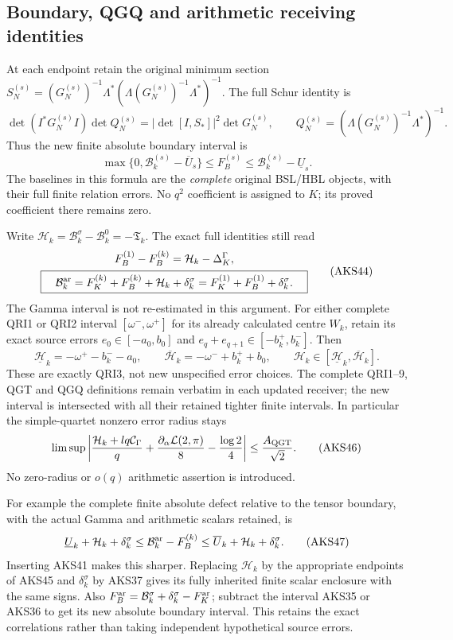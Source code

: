 \documentclass[11pt,a4paper]{article}
\begin{document}
\subsection{Boundary, QGQ and arithmetic receiving identities}
At each endpoint retain the original minimum section
$S_N^{(s)}=(G_N^{(s)})^{-1}\Lambda^*
(\Lambda(G_N^{(s)})^{-1}\Lambda^*)^{-1}$. The full Schur identity is
\[
 \det(I^*G_N^{(s)}I)\det Q_N^{(s)}
       =|\det[I,S_*]|^2\det G_N^{(s)},\qquad
 Q_N^{(s)}=(\Lambda(G_N^{(s)})^{-1}\Lambda^*)^{-1}.
 \tag{AKS42}
\]
Thus the new finite absolute boundary interval is
\[
 \max\{0,\mathcal B_k^{(s)}-\overline U_s\}
       \le F_B^{(s)}\le\mathcal B_k^{(s)}-\underline U_s.
 \tag{AKS43}
\]
The baselines in this formula are the \emph{complete} original BSL/HBL
objects, with their full finite relation errors. No $q^2$ coefficient is
assigned to $K$; its proved coefficient there remains zero.

Write $\mathcal H_k=\mathcal B_k^\sigma-\mathcal B_k^0=-\mathfrak T_k$.
The exact full identities still read
\[
\begin{gathered}
 F_B^{(1)}-F_B^{(k)}=\mathcal H_k-\Delta_K^\Gamma,\\
 \boxed{\quad\mathcal B_k^{\rm ar}
   =F_K^{(k)}+F_B^{(k)}+\mathcal H_k+\delta_k^\sigma
   =F_K^{(1)}+F_B^{(1)}+\delta_k^\sigma.\quad}
\end{gathered}\tag{AKS44}
\]
The Gamma interval is not re-estimated in this argument. For either
complete QRI1 or QRI2 interval $[\omega^-,\omega^+]$ for its already
calculated centre $W_k$, retain its exact source errors
$e_0\in[-a_0,b_0]$ and $e_q+e_{q+1}\in[-b_k^+,b_k^-]$. Then
\[
 \underline{\mathcal H}_k=-\omega^+-b_k^--a_0,
 \qquad\overline{\mathcal H}_k=-\omega^-+b_k^++b_0,
 \qquad \mathcal H_k\in
       [\underline{\mathcal H}_k,\overline{\mathcal H}_k].
 \tag{AKS45}
\]
These are exactly QRI3, not new unspecified error choices. The complete
QRI1--9, QGT and QGQ definitions remain verbatim in each updated receiver;
the new interval is intersected with all their retained tighter finite
intervals. In particular the simple-quartet nonzero error radius stays
\[
 \limsup\left|
 \frac{\mathcal H_k+lq\mathcal C_\Gamma}{q}
       +\frac{\partial_\alpha\mathcal L(2,\pi)}8
       -\frac{\log2}{4}\right|\le\frac{A_{\rm QGT}}{\sqrt2}.
 \tag{AKS46}
\]
No zero-radius or $o(q)$ arithmetic assertion is introduced.

For example the complete finite absolute defect relative to the tensor
boundary, with the actual Gamma and arithmetic scalars retained, is
\[
 \underline U_k+\mathcal H_k+\delta_k^\sigma
 \le\mathcal B_k^{\rm ar}-F_B^{(k)}
 \le\overline U_k+\mathcal H_k+\delta_k^\sigma.
 \tag{AKS47}
\]
Inserting AKS41 makes this sharper. Replacing $\mathcal H_k$ by the
appropriate endpoints of AKS45 and $\delta_k^\sigma$ by AKS37 gives its
fully inherited finite scalar enclosure with the same signs.
Also $F_B^{\rm ar}=\mathcal B_k^\sigma+\delta_k^\sigma-F_K^{\rm ar}$;
subtract the interval AKS35 or AKS36 to get its new absolute boundary
interval. This retains the exact correlations rather than taking
independent hypothetical source errors.
\end{document}
